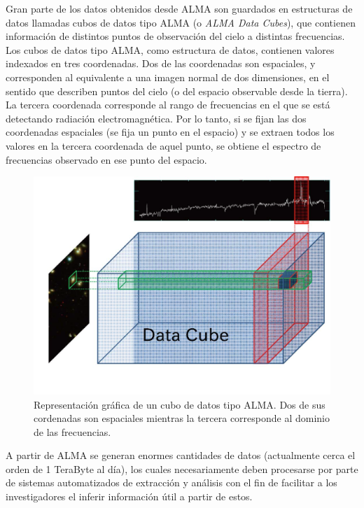 Gran parte de los datos obtenidos desde ALMA son guardados en estructuras de datos llamadas cubos de datos tipo ALMA (o \textit{ALMA Data Cubes})\label{fig:data_cube}, que contienen información de distintos puntos de observación del cielo a distintas frecuencias. Los cubos de datos tipo ALMA, como estructura de datos, contienen valores indexados en tres coordenadas. Dos de las coordenadas son espaciales, y corresponden al equivalente a una imagen normal de dos dimensiones, en el sentido que describen puntos del cielo (o del espacio observable desde la tierra). La tercera coordenada corresponde al rango de frecuencias en el que se está detectando radiación electromagnética. Por lo tanto, si se fijan las dos coordenadas espaciales (se fija un punto en el espacio) y se extraen todos los valores en la tercera coordenada de aquel punto, se obtiene el espectro de frecuencias observado en ese punto del espacio.

\begin{figure}[h!]
\begin{center}
\includegraphics[width=14cm]{imagenes/data_cube.png}
\end{center}
\vspace*{-5mm}
\caption{Representación gráfica de un cubo de datos tipo ALMA. Dos de sus cordenadas son espaciales mientras la tercera corresponde al dominio de las frecuencias.}
\label{fig:data_cube}
\end{figure}

A partir de ALMA se generan enormes cantidades de datos (actualmente cerca el orden de 1 TeraByte al día), los cuales necesariamente deben procesarse por parte de sistemas automatizados de extracción y análisis con el fin de facilitar a los investigadores el inferir información útil a partir de estos.

